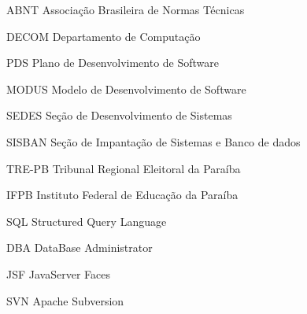 
\begin{siglas}
    \item[ABNT] Associação Brasileira de Normas Técnicas
    \item[DECOM] Departamento de Computação
    \item[PDS] Plano de Desenvolvimento de Software
    \item[MODUS] Modelo de Desenvolvimento de Software
    \item[SEDES] Seção de Desenvolvimento de Sistemas
    \item[SISBAN]Seção de Impantação de Sistemas e Banco de dados
    \item[TRE-PB] Tribunal Regional Eleitoral da Paraíba
    \item[IFPB] Instituto Federal de Educação da Paraíba
    \item[SQL] Structured Query Language
    \item[DBA] DataBase Administrator
    \item[JSF] JavaServer Faces
    \item[SVN] Apache Subversion
\end{siglas}

